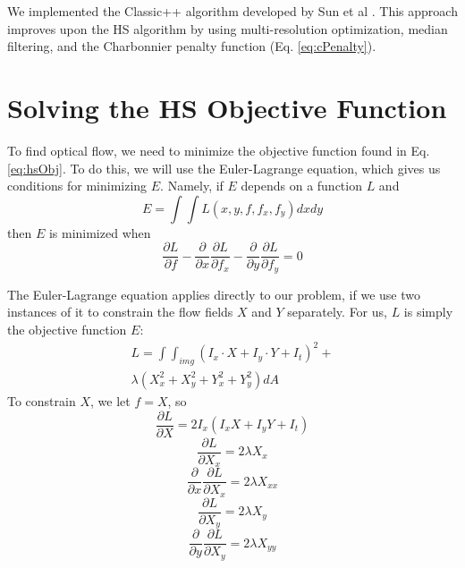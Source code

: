 \documentclass[10pt,twocolumn,letterpaper]{article}
\begin{document}
We implemented the Classic++ algorithm developed by Sun et al  \cite{sun}. This approach improves upon the HS algorithm by using multi-resolution optimization, median filtering, and the Charbonnier penalty function (Eq. \ref{eq:cPenalty}).

\section{Solving the HS Objective Function}

To find optical flow, we need to minimize the objective function found in Eq. \ref{eq:hsObj}.  To do this, we will use the Euler-Lagrange equation, which gives us conditions for minimizing $E$.  Namely, if $E$ depends on a function $L$ and
\begin{equation} \label{eq:eulerL}
E = \int \int L(x, y, f, f_x, f_y) dxdy
\end{equation}
then $E$ is minimized when 
\begin{equation} \label{eq:eulerCondition}
\frac{\partial L}{\partial f} - \frac{\partial}{\partial x} \frac{\partial L}{\partial f_x} - \frac{\partial}{\partial y} \frac{\partial L}{\partial f_y} = 0
\end{equation}

The Euler-Lagrange equation applies directly to our problem, if we use two instances of it to constrain the flow fields $X$ and $Y$ separately.  For us, $L$ is simply the objective function $E$: 
\begin{multline} \label{eq:eulerL2}
L =  \int \int_{img} (I_x \cdot X + I_y \cdot Y + I_t)^2 + \\
\lambda ( X_x^2 + X_y^2 + Y_x^2 + Y_y^2 ) dA 
\end{multline}
To constrain $X$, we let $f=X$, so 
\begin{equation} \label{eq:eulerPlug1}
\frac{\partial L}{\partial X} = 2I_x (I_x X + I_y Y + I_t)
\end{equation}
\begin{equation} \label{eq:eulerPlug2}
\frac{\partial L}{\partial X_x} = 2 \lambda X_x
\end{equation}
\begin{equation} \label{eq:eulerPlug3}
\frac{\partial}{\partial x} \frac{\partial L}{\partial X_x} = 2 \lambda X_{xx}
\end{equation}
\begin{equation} \label{eq:eulerPlug4}
\frac{\partial L}{\partial X_y} = 2 \lambda X_y
\end{equation}
\begin{equation} \label{eq:eulerPlug5}
\frac{\partial}{\partial y} \frac{\partial L}{\partial X_y} = 2 \lambda X_{yy}
\end{equation}
\end{document}
